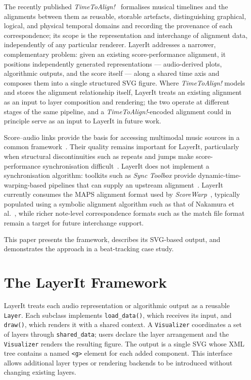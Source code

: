 \documentclass{article}
\begin{document}
The recently published \textit{TimeToAlign!}~\cite{hentschelTimeAlignModelling2026} formalises musical timelines and the alignments between them as reusable, storable artefacts, distinguishing graphical, logical, and physical temporal domains and recording the provenance of each correspondence; its scope is the representation and interchange of alignment data, independently of any particular renderer. LayerIt addresses a narrower, complementary problem: given an existing score-performance alignment, it positions independently generated representations --- audio-derived plots, algorithmic outputs, and the score itself --- along a shared time axis and composes them into a single structured SVG figure. Where \textit{TimeToAlign!} models and stores the alignment relationship itself, LayerIt treats an existing alignment as an input to layer composition and rendering; the two operate at different stages of the same pipeline, and a \textit{TimeToAlign!}-encoded alignment could in principle serve as an input to LayerIt in future work.

Score--audio links provide the basis for accessing multimodal music sources in a common framework~\cite{thomasLinkingSheetMusic2012}. Their quality remains important for LayerIt, particularly when structural discontinuities such as repeats and jumps make score-performance synchronisation difficult~\cite{fremereyHandlingRepeats2010}. LayerIt does not implement a synchronisation algorithm: toolkits such as \textit{Sync Toolbox} provide dynamic-time-warping-based pipelines that can supply an upstream alignment~\cite{mullerSyncToolbox2021}. LayerIt currently consumes the MAPS alignment format used by \textit{ScoreWarp}~\cite{weiglMultimodalMusicInformation2020}, typically populated using a symbolic alignment algorithm such as that of Nakamura et al.~\cite{nakamuraPerformanceErrorDetection2017}, while richer note-level correspondence formats such as the match file format~\cite{foscarinMatchFileFormat2022} remain a target for future interchange support.

This paper presents the framework, describes its SVG-based output, and demonstrates the approach in a beat-tracking case study.

\section{The LayerIt Framework}\label{sec:framework}
LayerIt treats each audio representation or algorithmic output as a reusable \texttt{Layer}. Each subclass implements \texttt{load\_data()}, which receives its input, and \texttt{draw()}, which renders it with a shared context. A \texttt{Visualizer} coordinates a set of layers through \texttt{shared\_data}; users declare the layer arrangement and the \texttt{Visualizer} renders the resulting figure. The output is a single SVG whose XML tree contains a named \texttt{<g>} element for each added component. This interface allows additional layer types or rendering backends to be introduced without changing existing layers.
\end{document}
